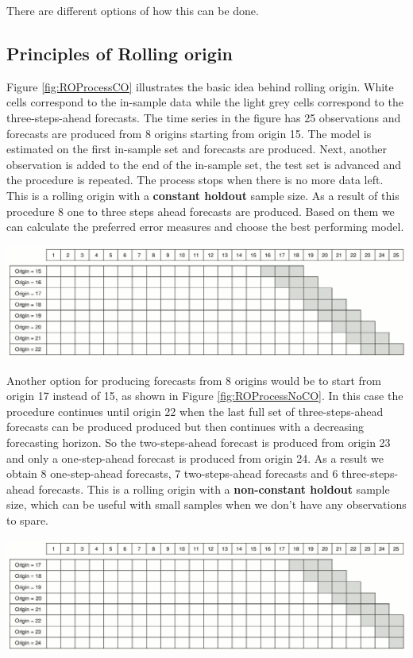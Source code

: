 \documentclass[
]{book}
\theoremstyle{definition}
\theoremstyle{definition}
\theoremstyle{definition}
\theoremstyle{definition}
\theoremstyle{remark}
\begin{document}
There are different options of how this can be done.

\hypertarget{principles-of-rolling-origin}{%
\subsection{Principles of Rolling origin}\label{principles-of-rolling-origin}}

Figure \ref{fig:ROProcessCO} \citep{Svetunkov2017} illustrates the basic idea behind rolling origin. White cells correspond to the in-sample data while the light grey cells correspond to the three-steps-ahead forecasts. The time series in the figure has 25 observations and forecasts are produced from 8 origins starting from origin 15. The model is estimated on the first in-sample set and forecasts are produced. Next, another observation is added to the end of the in-sample set, the test set is advanced and the procedure is repeated. The process stops when there is no more data left. This is a rolling origin with a \textbf{constant holdout} sample size. As a result of this procedure 8 one to three steps ahead forecasts are produced. Based on them we can calculate the preferred error measures and choose the best performing model.

\includegraphics{./images/03-ROProcessCO.jpg}

Another option for producing forecasts from 8 origins would be to start from origin 17 instead of 15, as shown in Figure \ref{fig:ROProcessNoCO}. In this case the procedure continues until origin 22 when the last full set of three-steps-ahead forecasts can be produced produced but then continues with a decreasing forecasting horizon. So the two-steps-ahead forecast is produced from origin 23 and only a one-step-ahead forecast is produced from origin 24. As a result we obtain 8 one-step-ahead forecasts, 7 two-steps-ahead forecasts and 6 three-steps-ahead forecasts. This is a rolling origin with a \textbf{non-constant holdout} sample size, which can be useful with small samples when we don't have any observations to spare.

\includegraphics{./images/03-ROProcessNoCO.jpg}
\end{document}
